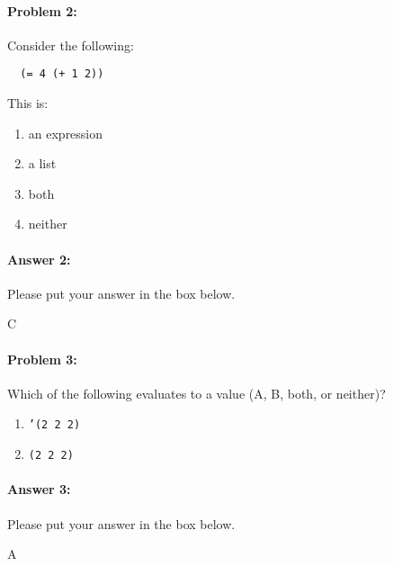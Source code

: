 \documentclass[10pt]{article}
\newenvironment{AnswerBox}{\begin{mdframed}[style=simple]}{\end{mdframed}}
\begin{document}
\noindent\hrulefill%

\paragraph{Problem 2:} Consider the following:
\begin{lstlisting}
  (= 4 (+ 1 2))
\end{lstlisting}
This is:
\begin{enumerate}[nosep, label=\Alph*.]
  \item an expression
  \item a list
  \item both
  \item neither
\end{enumerate}

\paragraph{Answer 2:} Please put your answer in the box below.

\begin{AnswerBox}%
    

    C

\end{AnswerBox}%

\hrulefill%

\paragraph{Problem 3:} Which of the following evaluates to a value (A, B, both,
or neither)?

\begin{enumerate}[nosep, label=\Alph*.]
  \item \texttt{'(2 2 2)}
  \item \texttt{(2 2 2)}
\end{enumerate}

\paragraph{Answer 3:} Please put your answer in the box below.

\begin{AnswerBox}%


  A

\end{AnswerBox}%
\end{document}

